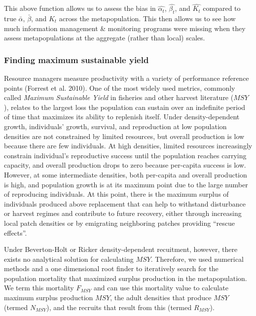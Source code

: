 \documentclass[
]{article}
\begin{document}
This above function allows us to assess the bias in \(\hat{\alpha_t}\),
\(\hat{\beta_t}\), and \(\hat{K_t}\) compared to true \(\bar{\alpha}\),
\(\bar{\beta}\), and \({K}_t\) across the metapopulation. This then
allows us to see how much information management \& monitoring programs
were missing when they assess metapopulations at the aggregate (rather
than local) scales.

\hypertarget{finding-maximum-sustainable-yield}{%
\subsubsection{Finding maximum sustainable
yield}\label{finding-maximum-sustainable-yield}}

Resource managers measure productivity with a variety of performance
reference points (Forrest et al. 2010). One of the most widely used
metrics, commonly called \emph{Maximum Sustainable Yield} in fisheries
and other harvest literature (\(MSY\)), relates to the largest loss the
population can sustain over an indefinite period of time that maximizes
its ability to replenish itself. Under density-dependent growth,
individuals' growth, survival, and reproduction at low population
densities are not constrained by limited resources, but overall
production is low because there are few individuals. At high densities,
limited resources increasingly constrain individual's reproductive
success until the population reaches carrying capacity, and overall
production drops to zero because per-capita success is low. However, at
some intermediate densities, both per-capita and overall production is
high, and population growth is at its maximum point due to the large
number of reproducing individuals. At this point, there is the maximum
surplus of individuals produced above replacement that can help to
withstand disturbance or harvest regimes and contribute to future
recovery, either through increasing local patch densities or by
emigrating neighboring patches providing ``rescue effects''.

Under Beverton-Holt or Ricker density-dependent recuitment, however,
there exists no analytical solution for calculating \(MSY\). Therefore,
we used numerical methods and a one dimensional root finder to
iteratively search for the population mortality that maximized surplus
production in the metapopulation. We term this mortality \(F_{MSY}\) and
can use this mortality value to calculate maximum surplus production
\(MSY\), the adult densities that produce \(MSY\) (termed \(N_{MSY}\)),
and the recruits that result from this (termed \(R_{MSY}\)).
\end{document}
